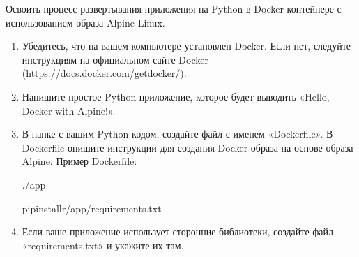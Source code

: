 \documentclass[letterpaper,10pt,russian]{sphinxmanual}
\begin{document}
\sphinxAtStartPar
{}

\sphinxAtStartPar
{} Освоить процесс развертывания приложения на Python в Docker контейнере с использованием образа Alpine Linux.

\sphinxAtStartPar
{}
\begin{enumerate}
%
\item {} 
\sphinxAtStartPar
{} Убедитесь, что на вашем компьютере установлен Docker. Если нет, следуйте инструкциям на официальном сайте Docker (https://docs.docker.com/get\sphinxhyphen{}docker/).

\item {} 
\sphinxAtStartPar
{} Напишите простое Python приложение, которое будет выводить «Hello, Docker with Alpine!».

\item {} 
\sphinxAtStartPar
{} В папке с вашим Python кодом, создайте файл с именем «Dockerfile». В Dockerfile опишите инструкции для создания Docker образа на основе образа Alpine. Пример Dockerfile:

\begin{sphinxVerbatim}[commandchars=\\\{\}]

./app

pipinstall\PYGZhy{}r/app/requirements.txt


\PYG{p}{[}\PYG{p}{]}
\end{sphinxVerbatim}

\item {} 
\sphinxAtStartPar
{} Если ваше приложение использует сторонние библиотеки, создайте файл «requirements.txt» и укажите их там.


\end{enumerate}
\end{document}
